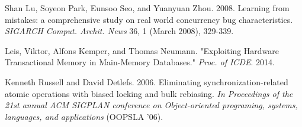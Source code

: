 \documentclass{sigplanconf}
\begin{document}
\begin{thebibliography}{}
  Shan Lu, Soyeon Park, Eunsoo Seo, and Yuanyuan Zhou. 2008. Learning
  from mistakes: a comprehensive study on real world concurrency bug
  characteristics. \emph{SIGARCH Comput. Archit. News} 36, 1 (March 2008),
  329-339.

  Leis, Viktor, Alfons Kemper, and Thomas Neumann. "Exploiting
  Hardware Transactional Memory in Main-Memory Databases."
  \emph{Proc. of ICDE}. 2014.

  Kenneth Russell and David Detlefs. 2006. Eliminating
  synchronization-related atomic operations with biased locking and
  bulk rebiasing. \emph{In Proceedings of the 21st annual ACM SIGPLAN
    conference on Object-oriented programing, systems, languages, and
    applications} (OOPSLA '06).

\end{thebibliography}
\end{document}
